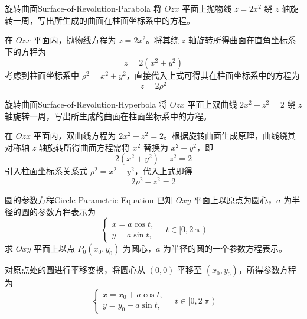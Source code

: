 \begin{problem}{旋转曲面}{Surface-of-Revolution-Parabola}
    将 $Ozx$ 平面上抛物线 $z = 2x^2$ 绕 $z$ 轴旋转一周，写出所生成的曲面在柱面坐标系中的方程。
\end{problem}

\begin{solution}
    在 $Ozx$ 平面内，抛物线方程为 $z = 2x^2$。将其绕 $z$ 轴旋转所得曲面在直角坐标系下的方程为
    \begin{equation}
        z = 2(x^2 + y^2)
    \end{equation}
    考虑到柱面坐标系中 $\rho^2 = x^2 + y^2$，直接代入上式可得其在柱面坐标系中的方程为
    \begin{equation}
        \boxed{z = 2\rho^2}
    \end{equation}
\end{solution}

\begin{problem}{旋转曲面}{Surface-of-Revolution-Hyperbola}
    将 $Ozx$ 平面上双曲线 $2x^2 - z^2 = 2$ 绕 $z$ 轴旋转一周，写出所生成的曲面在柱面坐标系中的方程。
\end{problem}

\begin{solution}
    在 $Ozx$ 平面内，双曲线方程为 $2x^2 - z^2 = 2$。根据旋转曲面生成原理，曲线绕其对称轴 $z$ 轴旋转所得曲面方程需将 $x^2$ 替换为 $x^2 + y^2$，即
    \begin{equation}
        2(x^2 + y^2) - z^2 = 2
    \end{equation}
    引入柱面坐标系关系式 $\rho^2 = x^2 + y^2$，代入上式即得
    \begin{equation}
        \boxed{2\rho^2 - z^2 = 2}
    \end{equation}
\end{solution}


\begin{problem}{圆的参数方程}{Circle-Parametric-Equation}
    已知 $Oxy$ 平面上以原点为圆心，$a$ 为半径的圆的参数方程表示为
    \begin{equation}
        \begin{cases}
            x = a \cos t, \\
            y = a \sin t,
        \end{cases} \quad t \in [0, 2\uppi)
    \end{equation}
    求 $Oxy$ 平面上以点 $P_0(x_0, y_0)$ 为圆心，$a$ 为半径的圆的一个参数方程表示。
\end{problem}

\begin{solution}
    对原点处的圆进行平移变换，将圆心从 $(0, 0)$ 平移至 $(x_0, y_0)$，所得参数方程为
    \begin{equation}
        \boxed{
        \begin{cases}
            x = x_0 + a \cos t, \\
            y = y_0 + a \sin t,
        \end{cases} \quad t \in [0, 2\uppi)
        }
    \end{equation}
\end{solution}


